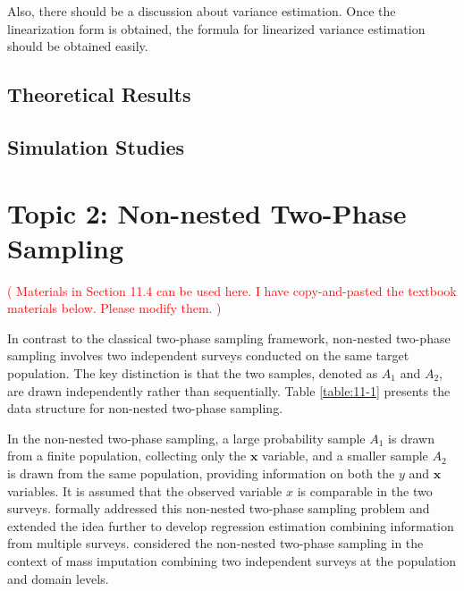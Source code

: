 \documentclass[12pt]{article}
\newcommand{\bx}{\mathbf{x}}
\begin{document}
Also, there should be a discussion about variance estimation. Once the linearization form is obtained, the formula for linearized variance estimation should be obtained easily. 


\subsection*{Theoretical Results}




\subsection*{Simulation Studies}





\section*{Topic 2: Non-nested Two-Phase Sampling}

\textcolor{red}{
( Materials in Section 11.4 can be used here. I have copy-and-pasted the textbook materials below. Please modify them.  )
} 

In contrast to the classical two-phase sampling framework, non-nested two-phase sampling involves two independent surveys conducted on the same target population. The key distinction is that the two samples, denoted as $A_1$ and $A_2$, are drawn independently rather than sequentially.  Table \ref{table:11-1} presents the data structure for non-nested two-phase sampling. 

In the non-nested two-phase sampling, 
a large probability sample $A_1$ is drawn from a finite population,  collecting  only the $\bx$ variable, and  a  smaller sample $A_2$ is drawn from the same population, providing information  on both the $y$ and $\bx$ variables.
It is assumed that the observed variable $x$ is comparable in the two surveys. \cite{renssen1997} formally addressed this non-nested two-phase sampling problem  and 
\cite{merkouris2004} extended the idea further to develop regression estimation combining information from multiple surveys. 
\cite{kimrao12} considered the non-nested two-phase sampling in the context of mass imputation combining two independent surveys at the population and domain levels.
\end{document}
